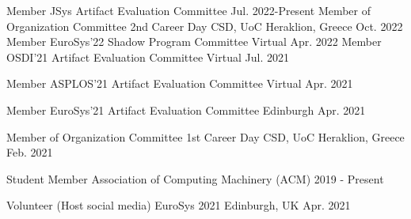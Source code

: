 \begin{cvhonors}
	\cvhonor
	{Member} %
	{JSys Artifact Evaluation Committee} %
	{} %
	{Jul. 2022-Present} %
	\cvhonor
	{Member of Organization Committee} %
	{2nd Career Day CSD, UoC} %
	{Heraklion, Greece} %
	{Oct. 2022} %
	\cvhonor
	{Member} %
	{EuroSys'22 Shadow Program Committee} %
	{Virtual} %
	{Apr. 2022} %
	\cvhonor
	{Member} %
	{OSDI'21 Artifact Evaluation Committee} %
	{Virtual} %
	{Jul. 2021} %

	\cvhonor
	{Member} %
	{ASPLOS'21 Artifact Evaluation Committee} %
	{Virtual} %
	{Apr. 2021} %


	\cvhonor
	{Member} %
	{EuroSys'21 Artifact Evaluation Committee} %
	{Edinburgh} %
	{Apr. 2021} %

	\cvhonor
	{Member of Organization Committee} %
	{1st Career Day CSD, UoC} %
	{Heraklion, Greece} %
	{Feb. 2021} %

	\cvhonor
	{Student Member} %
	{Association of Computing Machinery (ACM)} %
	{} %
	{2019 - Present} %

	\cvhonor
	{Volunteer (Host social media)} %
	{EuroSys 2021} %
	{Edinburgh, UK} %
	{Apr. 2021} %


\end{cvhonors}
